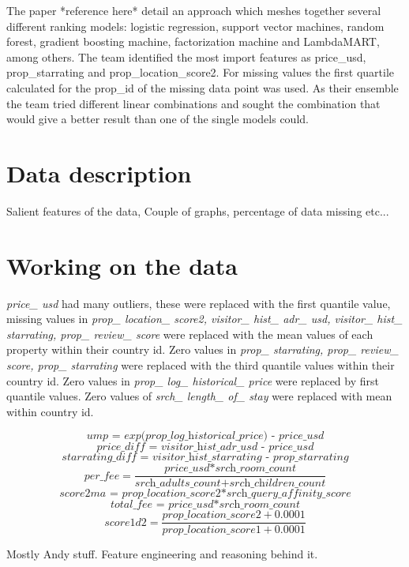 \documentclass{llncs}
\begin{document}
The paper *reference here* detail an approach which meshes together several different ranking models: logistic regression, support vector machines, random forest, gradient boosting machine, factorization machine and LambdaMART, among others. The team identified the most import features as price\_usd, prop\_starrating and prop\_location\_score2. For missing values the first quartile calculated for the prop\_id of the missing data point was used. As their ensemble the team tried different linear combinations and sought the combination that would give a better result than one of the single models could.  

 
\section{Data description}

Salient features of the data, Couple of graphs, percentage of data missing etc...

\section{Working on the data}

\textit{price\_ usd} had many outliers, these were replaced with the first quantile value, missing values in \textit{prop\_ location\_ score2, visitor\_ hist\_ adr\_ usd, visitor\_ hist\_ starrating, prop\_ review\_ score} were replaced with the mean values of each property within their country id. Zero values in \textit{prop\_ starrating, prop\_ review\_ score, prop\_ starrating} were replaced with the third quantile values within their country id. Zero values in \textit{prop\_ log\_ historical\_ price} were replaced by first quantile values. Zero values of \textit{srch\_ length\_ of\_ stay} were replaced with mean within country id.

\[\textit{ump = exp(prop\_ log\_ historical\_ price) - price\_ usd}\]
\[\textit{price\_ diff = visitor\_ hist\_ adr\_ usd - price\_ usd}\]
\[\textit{starrating\_ diff = visitor\_ hist\_ starrating - prop\_ starrating}\]
\[\textit{per\_ fee} = \frac{\textit{price\_ usd*srch\_ room\_ count}}{\textit{srch\_ adults\_ count+srch\_ children\_ count}}\]
\[\textit{score2ma = prop\_ location\_ score2*srch\_ query\_ affinity\_ score}\]
\[\textit{total\_ fee = price\_ usd*srch\_ room\_ count}\]
\[ \textit{score1d2} = \frac{\textit{prop\_ location\_ score2} + 0.0001}{\textit{prop\_ location\_ score1} + 0.0001}\]

Mostly Andy stuff.
Feature engineering and reasoning behind it.
\end{document}
